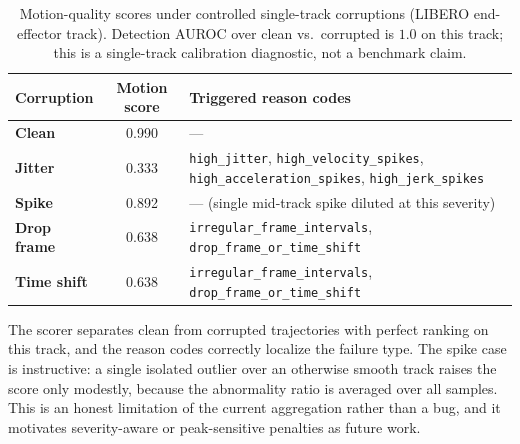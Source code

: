 \documentclass[11pt,oneside]{report}
\begin{document}
\begin{table}[htbp]
\centering
\caption{Motion-quality scores under controlled single-track corruptions (LIBERO
end-effector track). Detection AUROC over clean vs.\ corrupted is $1.0$ on this
track; this is a single-track calibration diagnostic, not a benchmark claim.}
\label{tab:corruption}
\begin{tabularx}{\textwidth}{>{\bfseries}l c X}
\toprule
Corruption & Motion score & Triggered reason codes \\
\midrule
Clean       & 0.990 & --- \\
Jitter      & 0.333 & \texttt{high\_jitter}, \texttt{high\_velocity\_spikes}, \texttt{high\_acceleration\_spikes}, \texttt{high\_jerk\_spikes} \\
Spike       & 0.892 & --- (single mid-track spike diluted at this severity) \\
Drop frame  & 0.638 & \texttt{irregular\_frame\_intervals}, \texttt{drop\_frame\_or\_time\_shift} \\
Time shift  & 0.638 & \texttt{irregular\_frame\_intervals}, \texttt{drop\_frame\_or\_time\_shift} \\
\bottomrule
\end{tabularx}
\end{table}

The scorer separates clean from corrupted trajectories with perfect ranking on
this track, and the reason codes correctly localize the failure type. The spike
case is instructive: a single isolated outlier over an otherwise smooth track
raises the score only modestly, because the abnormality ratio is averaged over
all samples. This is an honest limitation of the current aggregation rather than
a bug, and it motivates severity-aware or peak-sensitive penalties as future
work.
\end{document}
